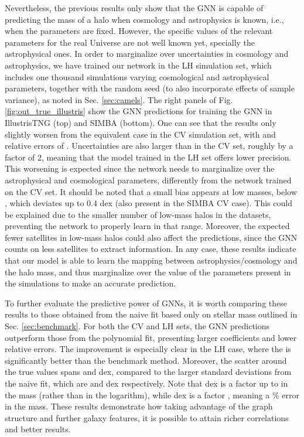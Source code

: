 \documentclass[twocolumn]{aastex631}
\begin{document}
Nevertheless, the previous results only show that the GNN is capable of predicting the mass of a halo when cosmology and astrophysics is known, i.e., when the parameters are fixed. However, the specific values of the relevant parameters for the real Universe are not well known yet, specially the astrophysical ones. In order to marginalize over uncertainties in cosmology and astrophysics, we have trained our network in the LH simulation set, which includes one thousand simulations varying cosmological and astrophysical parameters, together with the random seed (to also incorporate effects of sample variance), as noted in Sec. \ref{sec:camels}. The right panels of Fig. \ref{fig:out_true_illustris} show the GNN predictions for training the GNN in IllustrisTNG (top) and SIMBA (bottom). One can see that the results only slightly worsen from the equivalent case in the CV simulation set, with  and relative errors of . Uncertainties are also larger than in the CV set, roughly by a factor of 2, meaning that the model trained in the LH set offers lower precision. This worsening is expected since the network needs to marginalize over the astrophysical and cosmological parameters, differently from the network trained on the CV set. It should be noted that a small bias appears at low masses, below , which deviates up to 0.4 dex (also present in the SIMBA CV case). This could be explained due to the smaller number of low-mass halos in the datasets, preventing the network to properly learn in that range. Moreover, the expected fewer satellites in low-mass halos could also affect the predictions, since the GNN counts on less satellites to extract information. In any case, these results indicate that our model is able to learn the mapping between astrophysics/cosmology and the halo mass, and thus marginalize over the value of the parameters present in the simulations to make an accurate prediction.


To further evaluate the predictive power of GNNs, it is worth comparing these results to those obtained from the naive fit based only on stellar mass outlined in Sec. \ref{sec:benchmark}. For both the CV and LH sets, the GNN predictions outperform those from the polynomial fit, presenting larger  coefficients and lower relative errors. The improvement is especially clear in the LH case, where the  is significantly better than  the benchmark method. Moreover, the scatter around the true values spans  and  dex, compared to the larger standard deviations from the naive fit, which are  and  dex respectively. Note that  dex is a factor up to  in the mass (rather than in the logarithm), while  dex is a factor , meaning a  \% error in the mass. These results demonstrate how taking advantage of the graph structure and further galaxy features, it is possible to attain richer correlations and better results.
\end{document}
